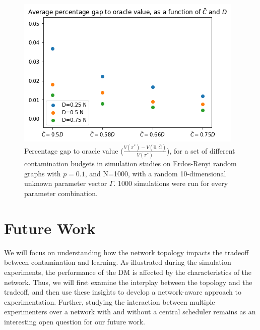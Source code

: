 \documentclass[11pt,a4paper]{article}
\begin{document}
\begin{figure}[!h]
\begin{center}
\includegraphics[scale=0.5]{Network_Sim/n1000_simresults_noerrors}
\caption{Percentage gap to oracle value ($\frac{ V(\pi^*) - V(\hat \pi, \bar{C})}{V(\pi^*) }$), for a set of different contamination budgets in simulation studies on Erdos-Renyi random graphs with $p = 0.1$, and N=1000, with a random 10-dimensional unknown parameter vector $\Gamma$. 1000 simulations were run for every parameter combination.}
\end{center}
\end{figure}

\section{Future Work}
We will focus on understanding how the network topology impacts the tradeoff between contamination and learning. As illustrated during the simulation experiments, the performance of the DM is affected by the characteristics of the network. Thus, we will first examine the interplay between the topology and the tradeoff, and then use these insights to develop a network-aware approach to experimentation. Further, studying the interaction between multiple experimenters over a network with and without a central scheduler remains as an interesting open question for our future work.
\end{document}
